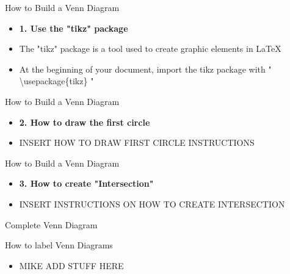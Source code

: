 \documentclass{beamer}
\begin{document}
	\begin{frame}[t,label=frameA]{How to Build a Venn Diagram}
		\begin{itemize}
			\item{\textbf{1. Use the "tikz" package}}
			\item{The "tikz" package is a tool used to create graphic elements in LaTeX}
			\item{At the beginning of your document, import the tikz package with " \textbackslash usepackage\{tikz\} "}
		\end{itemize}
	\end{frame}
	
	\begin{frame}[t,label=frameA]{How to Build a Venn Diagram}
		\begin{itemize}
			\item{\textbf{2. How to draw the first circle}}
			\item{INSERT HOW TO DRAW FIRST CIRCLE INSTRUCTIONS}
		\end{itemize}
	\end{frame}
	
	\begin{frame}[t,label=frameA]{How to Build a Venn Diagram}
		\begin{itemize}
			\item{\textbf{3. How to create "Intersection"}}
			\item{INSERT INSTRUCTIONS ON HOW TO CREATE INTERSECTION}
		\end{itemize}
	\end{frame}
	
	\begin{frame}[t,label=frameA] {Complete Venn Diagram}
	\end{frame}
	
	\begin{frame}[t,label=frameA]{How to label Venn Diagrams}
		\begin{itemize}
			\item {MIKE ADD STUFF HERE}
		\end{itemize}
		
	\end{frame}
	
	
	
	
\end{document}
